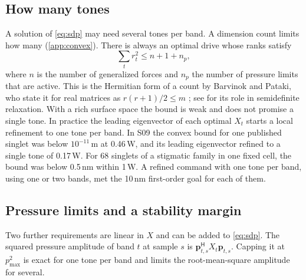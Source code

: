\documentclass[11pt,a4paper]{article}
\numberwithin{equation}{section}
\begin{document}
\subsection{How many tones}
A solution of \cref{eq:sdp} may need several tones per band. A dimension count
limits how many (\cref{app:convex}). There is always an optimal drive whose ranks
satisfy
\begin{equation}
 \sum_tr_t^2\le n+1+n_p ,
 \label{eq:rank}
\end{equation}
where $n$ is the number of generalized forces and $n_p$ the number of pressure
limits that are active. This is the Hermitian form of a count by Barvinok and
Pataki, who state it for real matrices as $r(r+1)/2\le m$
\cite{barvinok1995,pataki1998}; see \cite{luo2010} for its role in semidefinite
relaxation. With a rich surface space the bound is weak and does not promise a
single tone. In practice the leading eigenvector of each optimal $X_t$ starts a
local refinement to one tone per band. In S09 the convex bound for one published
singlet was below $10^{-11}$\,m at 0.46\,W, and its leading eigenvector refined
to a single tone of 0.17\,W. For 68 singlets of a stigmatic family in one fixed
cell, the bound was below 0.5\,nm within 1\,W. A refined command with one tone
per band, using one or two bands, met the 10\,nm first-order goal for each of
them.

\subsection{Pressure limits and a stability margin}\label{sec:convex-constraints}
Two further requirements are linear in $X$ and can be added to \cref{eq:sdp}.
The squared pressure amplitude of band $t$ at sample $s$ is
$\bm p_{t,s}^{\mathsf H}X_t\bm p_{t,s}$. Capping it at $p_{\max}^2$ is exact for
one tone per band and limits the root-mean-square amplitude for several.
\end{document}
